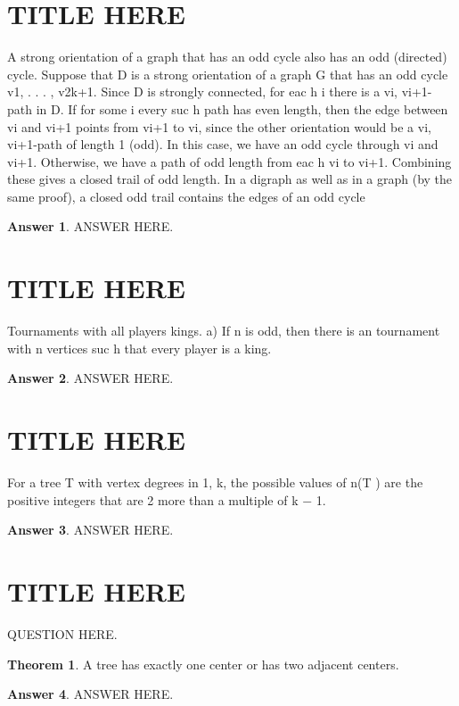\documentclass[a4paper]{article}
\renewcommand{\(}{\left(}
\renewcommand{\)}{\right)}
\theoremstyle{plain}
\theoremstyle{plain}
\theoremstyle{definition}
\newtheorem*{answer}{Answer}
\newtheorem{theorem}{Theorem}[section]
\begin{document}
\section{TITLE HERE}
A strong orientation of a graph that has an odd cycle also has an odd (directed) cycle. Suppose
that D is a strong orientation of a graph G that has an odd cycle v1, . . . , v2k+1. Since D is strongly
connected, for eac h i there is a vi, vi+1-path in D. If for some i every suc h path has even length,
then the edge between vi and vi+1 points from vi+1 to vi, since the other orientation would be a vi,
vi+1-path of length 1 (odd). In this case, we have an odd cycle through vi and vi+1. Otherwise, we
have a path of odd length from eac h vi to vi+1. Combining these gives a closed trail of odd length.
In a digraph as well as in a graph (by the same proof), a closed odd trail contains the edges of an
odd cycle
\begin{shaded}
\begin{answer}
ANSWER HERE.
\end{answer}
\end{shaded}

\section{TITLE HERE}
Tournaments with all players kings. a) If n is odd, then there is an tournament with n vertices suc
h that every player is a king.
\begin{shaded}
\begin{answer}
ANSWER HERE.
\end{answer}
\end{shaded}


\section{TITLE HERE}
For a tree T with vertex degrees in {1, k}, the possible values of n(T ) are the positive integers
that are 2 more than a multiple of k − 1.
\begin{shaded}
\begin{answer}
ANSWER HERE.
\end{answer}
\end{shaded}



\section{TITLE HERE}
QUESTION HERE.
\begin{theorem}
A tree has exactly one center or has two adjacent centers.
\end{theorem}
\begin{shaded}
\begin{answer}
ANSWER HERE.
\end{answer}
\end{shaded}
\end{document}
